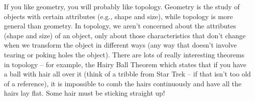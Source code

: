 \begin{comment}

\ActivitySolution
\be
\item Let $S = \{A \text{ is a set} \mid A \notin A\}$. 
	\ba
	\item If $S \in S$, then $S$ does not contain itself as an element. But then $S$ cannot be in $S$, so this is not possible.

	\item If $S \notin S$, then $S$ must contain itself as an element. But this contradicts the fact that $S \notin S$. 

	\item Our current definition of a set leads to a paradox -- a set with an element that is neither in the set nor not in the set. 
	
	\ea

\item
	\ba
	\item A subset $U$ of a set $S$ is a collection of elements of $S$. That is, $U$ is a subset of $S$ if $x \in S$ whenever $x \in U$. For example, if $S = \{1,2,3,4\}$, then $\{1,2\}$ and $\{1,3,4\}$ are subsets of $S$. 
	
	\item Since every element of $A$ is also an element of $A$, by our definition it is the case that $A$ is a subset of $A$. 
	
	\item The empty set is the set that contains no elements. Since $\emptyset$ contains no elements, by default every element of $\emptyset$ is an element of any other set. So $\emptyset$ is a subset of every set. 
	
	\ea	
\ee


\end{comment}



If you like geometry, you will probably like topology. Geometry is the study of objects with certain attributes (e.g., shape and size), while topology is more general than geometry. In topology, we aren't concerned about the attributes (shape and size) of an object, only about those characteristics that don't change when we transform the object in different ways (any way that doesn't involve tearing or poking holes the object).  There are lots of really interesting theorems in topology -- for example, the Hairy Ball Theorem which states that if you have a ball with hair all over it (think of a tribble from Star Trek -- if that isn't too old of a reference), it is impossible to comb the hairs continuously and have all the hairs lay flat. Some hair must be sticking straight up! 

